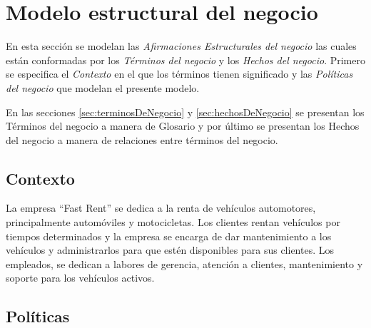 \documentclass[10pt]{book}
\begin{document}
\thispagestyle{empty}

\maketitle

\frontmatter
\tableofcontents
\listoffigures
\listoftables
\mainmatter

\chapter{Modelo estructural del negocio}

	En esta sección se modelan las {\em Afirmaciones Estructurales del negocio} las cuales están conformadas por los {\em Términos del negocio} y los {\em Hechos del negocio}. Primero se especifica el {\em Contexto} en el que los términos tienen significado y las {\em Políticas del negocio} que modelan el presente modelo. 
	
	En las secciones \ref{sec:terminosDeNegocio} y \ref{sec:hechosDeNegocio} se presentan los Términos del negocio a manera de Glosario y por último se presentan los Hechos del negocio a manera de relaciones entre términos del negocio.

\section{Contexto}

	La empresa ``Fast Rent'' se dedica a la renta de vehículos automotores, principalmente automóviles y motocicletas. Los clientes rentan vehículos por tiempos determinados y la empresa se encarga de dar mantenimiento a los vehículos y administrarlos para que estén disponibles para sus clientes. Los empleados, se dedican a labores de gerencia, atención a clientes, mantenimiento y soporte para los vehículos activos.

\section{Políticas}
\end{document}
